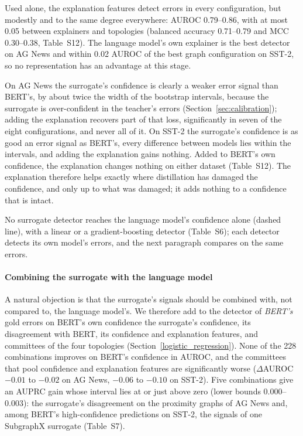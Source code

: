 Used alone, the explanation features detect errors in every configuration, but modestly and to the same degree everywhere: AUROC 0.79--0.86, with at most 0.05 between explainers and topologies (balanced accuracy 0.71--0.79 and MCC 0.30--0.38, Table~S12). The language model's own explainer is the best detector on AG News and within 0.02 AUROC of the best graph configuration on SST-2, so no representation has an advantage at this stage.

On AG News the surrogate's confidence is clearly a weaker error signal than BERT's, by about twice the width of the bootstrap intervals, because the surrogate is over-confident in the teacher's errors (Section~\ref{sec:calibration}); adding the explanation recovers part of that loss, significantly in seven of the eight configurations, and never all of it. On SST-2 the surrogate's confidence is as good an error signal as BERT's, every difference between models lies within the intervals, and adding the explanation gains nothing. Added to BERT's own confidence, the explanation changes nothing on either dataset (Table~S12). The explanation therefore helps exactly where distillation has damaged the confidence, and only up to what was damaged; it adds nothing to a confidence that is intact.

No surrogate detector reaches the language model's confidence alone (dashed line), with a linear or a gradient-boosting detector (Table~S6); each detector detects its own model's errors, and the next paragraph compares on the same errors.

\paragraph{Combining the surrogate with the language model}
A natural objection is that the surrogate's signals should be combined with, not compared to, the language model's. We therefore add to the detector of \emph{BERT's} gold errors on BERT's own confidence the surrogate's confidence, its disagreement with BERT, its confidence and explanation features, and committees of the four topologies (Section~\ref{logistic_regression}). None of the 228 combinations improves on BERT's confidence in AUROC, and the committees that pool confidence and explanation features are significantly worse (\(\Delta\)AUROC \(-0.01\) to \(-0.02\) on AG News, \(-0.06\) to \(-0.10\) on SST-2). Five combinations give an AUPRC gain whose interval lies at or just above zero (lower bounds 0.000--0.003): the surrogate's disagreement on the proximity graphs of AG News and, among BERT's high-confidence predictions on SST-2, the signals of one SubgraphX surrogate (Table~S7).

